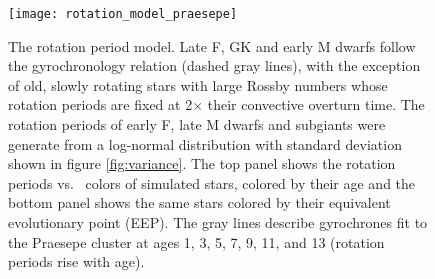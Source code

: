 \begin{figure}
  \caption{
The rotation period model.
Late F, GK and early M dwarfs follow the \citet{angus2015} gyrochronology
    relation (dashed gray lines), with the exception of old, slowly
    rotating stars with large Rossby numbers whose rotation periods are fixed
    at 2$\times$ their convective overturn time.
The rotation periods of early F, late M dwarfs and subgiants were generate
    from a log-normal distribution with standard deviation shown in figure
    \ref{fig:variance}.
The top panel shows the rotation periods vs. \gcolor\ colors of simulated stars,
    colored by their age and the bottom panel shows the same stars colored
    by their equivalent evolutionary point (EEP).
    The gray lines describe gyrochrones fit to the Praesepe cluster at ages 1,
    3, 5, 7, 9, 11, and 13 (rotation periods rise with age).
}
  \centering
    \texttt{[image: rotation\_model\_praesepe]}
\label{fig:rotation_model}
\end{figure}


